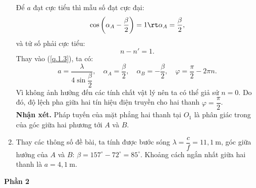 \begin{loigiai}
\begin{enumerate}[1)]
    Để $a$ đạt cực tiểu thì mẫu số đạt cực đại:
    \[\cos \left( \alpha_A - \dfrac{\beta}{2} \right) = 1 \rt \alpha_A = \dfrac{\beta}{2},\]
    và tử số phải cực tiểu:
    \[n - n' = 1.\]
    Thay vào (\ref{q.1.3}), ta có:
    \[a = \dfrac{\lambda}{4 \sin \dfrac{\beta}{2}},\quad \alpha_A = \dfrac{\beta}{2},\quad \alpha_B = - \dfrac{\beta}{2} ,\quad \varphi = \dfrac{\pi}{2} - 2\pi n.\]
    Vì không ảnh hưởng đến các tính chất vật lý nên ta có thể giả sử $n = 0$. Do đó, độ lệch pha giữa hai tín hiệu điện truyền cho hai thanh $\varphi = \dfrac{\pi}{2}$.\\
    \textbf{Nhận xét.} Pháp tuyến của mặt phẳng hai thanh tại $O_1$ là phân giác trong của góc giữa hai phương tới $A$ và $B$.
\item  Thay các thông số đề bài, ta tính được bước sóng $\lambda = \dfrac{c}{f} = 11,1 ~\mathrm{m}$, góc giữa hướng của $A$ và $B$: $\beta = 157^\circ - 72^\circ = 85^\circ$. Khoảng cách ngắn nhất giữa hai thanh là $a = 4,1 ~\mathrm{m}$.
\end{enumerate}

\begin{center}
    \bf Phần 2
\end{center}
\begin{center}


\begin{tikzpicture}[x=0.75pt,y=0.75pt,yscale=-1,xscale=1,scale=0.9]


\end{tikzpicture}
\end{center}
\end{loigiai}
